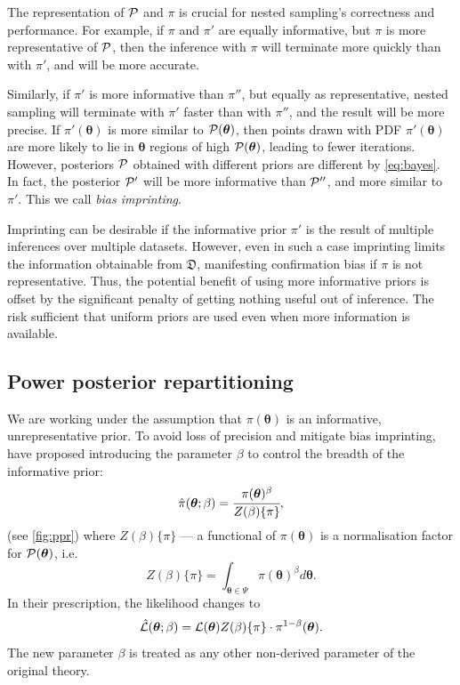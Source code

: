 \documentclass[usenatbib]{mnras}
\begin{document}
The representation of ${\cal P}$ and $\pi$ is crucial for nested
sampling's correctness and performance. For example, if $\pi$ and
$\pi'$ are equally informative, but $\pi$ is more representative of
${\cal P}$, then the inference with $\pi$ will terminate more quickly
than with $\pi'$, and will be more accurate.

Similarly, if $\pi'$ is more informative than $\pi''$, but equally as
representative, nested sampling will terminate with $\pi'$ faster than
with $\pi''$, and the result will be more precise. If
\(\pi' (\bm{\theta})\) is more similar to \( {\cal P} (\bm{\theta})\),
then points drawn with PDF \(\pi' (\bm{\theta})\) are more likely to
lie in $\bm{\theta}$ regions of high \( {\cal P} (\bm{\theta})\),
leading to fewer iterations. However, posteriors ${\cal P}$ obtained
with different priors are different by \cref{eq:bayes}. In fact, the
posterior ${\cal P}'$ will be more informative than ${\cal P}''$, and
more similar to $\pi'$. This we call \emph{bias imprinting}.


Imprinting can be desirable if the informative prior $\pi'$ is the
result of multiple inferences over multiple datasets. However, even in
such a case imprinting limits the information obtainable from
\(\mathfrak{D}\), manifesting confirmation bias if $\pi$ is not
representative. Thus, the potential benefit of using more informative
priors is offset by the significant penalty of getting nothing useful
out of inference. The risk sufficient that uniform priors are used
even when more information is available. 
\subsection{Power posterior repartitioning}\label{sec:autopr}
We are working under the assumption that $\pi(\bm{\theta})$ is an
informative, unrepresentative prior. To avoid loss of precision and
mitigate bias imprinting, \cite{chen-ferroz-hobson} have proposed
introducing the parameter \(\beta\) to control the breadth of the
informative prior:
\begin{equation}
  \label{eq:autopr-prior}
  \hat{\pi}(\bm{\bm{\theta}};\beta) = \cfrac{\pi(\bm{\theta})^{\beta}}{Z(\beta)\{\pi\}},
\end{equation}
(see \cref{fig:ppr}) where \(Z(\beta)\{\pi\}\) --- a functional of
\(\pi (\bm{\theta})\) is a normalisation factor for
\( {\cal P} (\bm{\theta})\), i.e.
\begin{equation}
  Z(\beta)\{\pi\} = \int_{\bm{\theta} \in \Psi} \pi(\bm{\bm{\theta}})^{\beta}d\bm{\bm{\theta}}.
\end{equation}
In their prescription, the likelihood changes to
\begin{equation}
  \hat{\cal L}(\bm{\theta}; \beta) = {\cal L}(\bm{\theta}) Z(\beta)\{\pi\} \cdot \pi^{1-\beta}(\bm{\theta}).
\end{equation}
The new parameter $\beta$ is treated as any other non-derived
parameter of the original theory.
\end{document}
